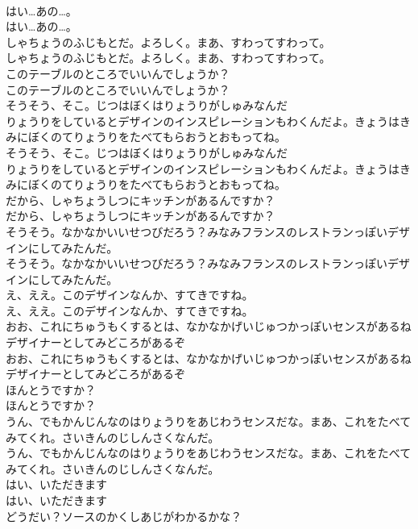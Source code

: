 \documentclass[8pt]{extreport}
\begin{document}
\begin{CJK}{UTF8}{min}
\\	はい…あの…。
\\	はい…あの…。
\\	しゃちょうのふじもとだ。よろしく。まあ、すわってすわって。
\\	しゃちょうのふじもとだ。よろしく。まあ、すわってすわって。
\\	このテーブルのところでいいんでしょうか？
\\	このテーブルのところでいいんでしょうか？
\\	そうそう、そこ。じつはぼくはりょうりがしゅみなんだ
\\	りょうりをしているとデザインのインスピレーションもわくんだよ。きょうはきみにぼくのてりょうりをたべてもらおうとおもってね。
\\	そうそう、そこ。じつはぼくはりょうりがしゅみなんだ
\\	りょうりをしているとデザインのインスピレーションもわくんだよ。きょうはきみにぼくのてりょうりをたべてもらおうとおもってね。
\\	だから、しゃちょうしつにキッチンがあるんですか？
\\	だから、しゃちょうしつにキッチンがあるんですか？
\\	そうそう。なかなかいいせつびだろう？みなみフランスのレストランっぽいデザインにしてみたんだ。
\\	そうそう。なかなかいいせつびだろう？みなみフランスのレストランっぽいデザインにしてみたんだ。
\\	え、ええ。このデザインなんか、すてきですね。
\\	え、ええ。このデザインなんか、すてきですね。
\\	おお、これにちゅうもくするとは、なかなかげいじゅつかっぽいセンスがあるね
\\	デザイナーとしてみどころがあるぞ
\\	おお、これにちゅうもくするとは、なかなかげいじゅつかっぽいセンスがあるね
\\	デザイナーとしてみどころがあるぞ
\\	ほんとうですか？
\\	ほんとうですか？
\\	うん、でもかんじんなのはりょうりをあじわうセンスだな。まあ、これをたべてみてくれ。さいきんのじしんさくなんだ。
\\	うん、でもかんじんなのはりょうりをあじわうセンスだな。まあ、これをたべてみてくれ。さいきんのじしんさくなんだ。
\\	はい、いただきます
\\	はい、いただきます
\\	どうだい？ソースのかくしあじがわかるかな？

\end{CJK}
\end{document}
